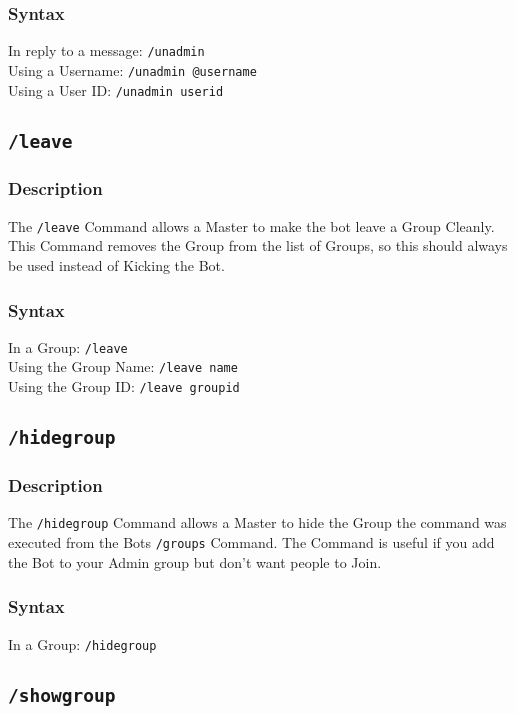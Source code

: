 \documentclass[a4paper]{article}
\begin{document}
        \subsubsection*{Syntax}
            In reply to a message: \texttt{/unadmin}\\
            Using a Username: \texttt{/unadmin @username}\\
            Using a User ID: \texttt{/unadmin userid}


    \subsection{\texttt{/leave}}
        \subsubsection*{Description}
            The \texttt{/leave} Command allows a Master to make the bot leave a Group Cleanly. This Command removes the Group from the list of Groups, so this should always be used instead of Kicking the Bot.

        \subsubsection*{Syntax}
            In a Group: \texttt{/leave}\\
            Using the Group Name: \texttt{/leave name}\\
            Using the Group ID: \texttt{/leave groupid}


    \subsection{\texttt{/hidegroup}}
        \subsubsection*{Description}
            The \texttt{/hidegroup} Command allows a Master to hide the Group the command was executed from the Bots \texttt{/groups} Command. The Command is useful if you add the Bot to your Admin group but don't want people to Join.

        \subsubsection*{Syntax}
            In a Group: \texttt{/hidegroup}


    \subsection{\texttt{/showgroup}}
\end{document}
